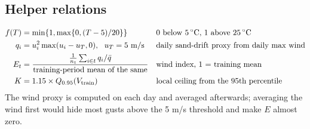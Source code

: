 \documentclass[11pt,a4paper]{article}
\begin{document}
\subsection{Helper relations}
\begin{align}
f(T)&=\min\{1,\max\{0,(T-5)/20\}\} &&\text{0 below 5\,$^\circ$C, 1 above 25\,$^\circ$C}\label{eq:fT}\\
q_i&=u_i^2\max(u_i-u_T,0),\ \ u_T=5\ \mathrm{m/s} &&\text{daily sand-drift proxy from daily max wind}\label{eq:q}\\
E_t&=\frac{\tfrac1{n_t}\sum_{i\in t}q_i/\bar q}{\text{training-period mean of the same}} &&\text{wind index, 1 = training mean}\label{eq:E}\\
K&=1.15\times Q_{0.95}(V_{\text{train}}) &&\text{local ceiling from the 95th percentile}\label{eq:K}
\end{align}
The wind proxy is computed on each day and averaged afterwards; averaging the wind first would
hide most gusts above the 5 m/s threshold and make $E$ almost zero.
\end{document}
